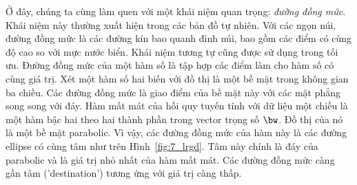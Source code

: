 Ở đây, chúng ta cùng làm quen với một khái niệm quan trọng: \textit{đường đồng
mức}. Khái niệm này thường xuất hiện trong các bản đồ tự nhiên. Với các ngọn
núi, đường đồng mức là các đường kín bao quanh đỉnh núi, bao gồm các điểm có
cùng độ cao so với mực nước biển. Khái niệm tương tự cũng được sử dụng trong tối
ưu. {Đường đồng mức} của một hàm số là tập hợp các điểm làm cho hàm số có cùng
giá trị. Xét một hàm số hai biến với đồ thị là một {bề mặt} trong
không gian ba chiều. Các đường đồng mức là giao điểm của bề mặt này với các mặt
phẳng song song với đáy. Hàm mất mát của hồi quy tuyến tính với dữ liệu một
chiều là một hàm bậc hai theo hai thành phần trong vector trọng số $\bw$. Đồ thị
của nó là một bề mặt parabolic. Vì vậy, các đường đồng mức của hàm này là các
đường ellipse có cùng tâm như trên Hình~\ref{fig:7_lrgd}. Tâm này chính là đáy
của parabolic và là giá trị nhỏ nhất của hàm mất mát. Các đường đồng mức càng
gần {tâm} ('destination') tương ứng với giá trị càng thấp.%







